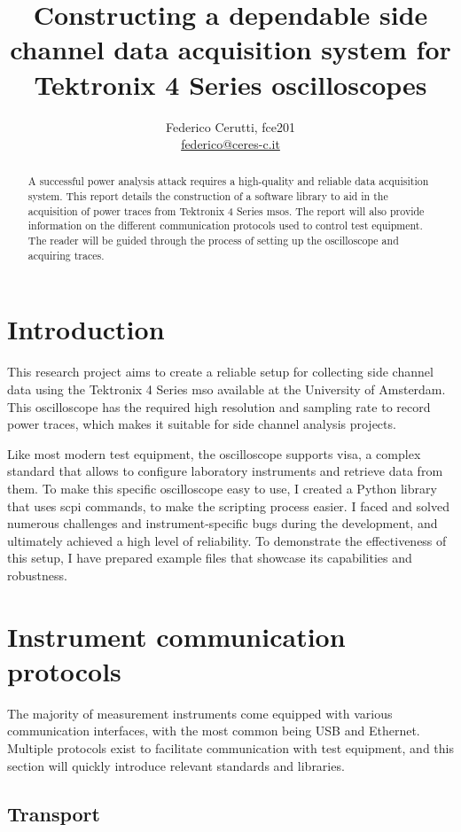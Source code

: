 \documentclass[a4paper,english,twoside,10pt]{article}
\title{Constructing a dependable side channel data acquisition system for Tektronix 4 Series oscilloscopes}
\author{Federico Cerutti, fce201 \\\href{mailto:federico@ceres-c.it}{federico@ceres-c.it}}
\begin{document}
\maketitle%
\glsunsetall%

\begin{abstract}
	A successful power analysis attack requires a high-quality and reliable data acquisition system. This report details the construction of a software library to aid in the acquisition of power traces from Tektronix 4 Series \glspl{mso}. The report will also provide information on the different communication protocols used to control test equipment. The reader will be guided through the process of setting up the oscilloscope and acquiring traces.
\end{abstract}

\section{Introduction}
This research project aims to create a reliable setup for collecting side channel data using the Tektronix 4 Series \gls{mso} available at the University of Amsterdam. This oscilloscope has the required high resolution and sampling rate to record power traces, which makes it suitable for side channel analysis projects.

Like most modern test equipment, the oscilloscope supports \gls{visa}, a complex standard that allows to configure laboratory instruments and retrieve data from them. To make this specific oscilloscope easy to use, I created a Python library that uses \gls{scpi} commands, to make the scripting process easier. I faced and solved numerous challenges and instrument-specific bugs during the development, and ultimately achieved a high level of reliability. To demonstrate the effectiveness of this setup, I have prepared example files that showcase its capabilities and robustness.

\glsresetall%
\section{Instrument communication protocols}\label{sec:comm-protocols}
The majority of measurement instruments come equipped with various communication interfaces, with the most common being USB and Ethernet. Multiple protocols exist to facilitate communication with test equipment, and this section will quickly introduce relevant standards and libraries.

\subsection{Transport}
\end{document}
